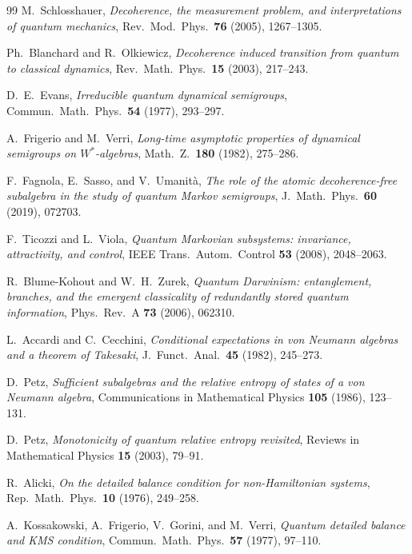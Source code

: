 \documentclass[11pt]{article}
\theoremstyle{definition}
\theoremstyle{remark}
\begin{document}
\begin{thebibliography}{99}
M.~Schlosshauer,
\emph{Decoherence, the measurement problem, and interpretations of quantum
mechanics},
Rev.\ Mod.\ Phys.\ \textbf{76} (2005), 1267--1305.

Ph.~Blanchard and R.~Olkiewicz,
\emph{Decoherence induced transition from quantum to classical dynamics},
Rev.\ Math.\ Phys.\ \textbf{15} (2003), 217--243.

D.~E.~Evans,
\emph{Irreducible quantum dynamical semigroups},
Commun.\ Math.\ Phys.\ \textbf{54} (1977), 293--297.

A.~Frigerio and M.~Verri,
\emph{Long-time asymptotic properties of dynamical semigroups on
$W^*$-algebras},
Math.\ Z.\ \textbf{180} (1982), 275--286.

F.~Fagnola, E.~Sasso, and V.~Umanit\`a,
\emph{The role of the atomic decoherence-free subalgebra in the study of
quantum Markov semigroups},
J.~Math.\ Phys.\ \textbf{60} (2019), 072703.

F.~Ticozzi and L.~Viola,
\emph{Quantum Markovian subsystems: invariance, attractivity, and control},
IEEE Trans.\ Autom.\ Control \textbf{53} (2008), 2048--2063.

R.~Blume-Kohout and W.~H.~Zurek,
\emph{Quantum Darwinism: entanglement, branches, and the emergent
classicality of redundantly stored quantum information},
Phys.\ Rev.\ A \textbf{73} (2006), 062310.


L.~Accardi and C.~Cecchini,
\emph{Conditional expectations in von Neumann algebras and a theorem of
Takesaki},
J.~Funct.\ Anal.\ \textbf{45} (1982), 245--273.

D.~Petz,
\emph{Sufficient subalgebras and the relative entropy of states of a von
Neumann algebra},
Communications in Mathematical Physics \textbf{105} (1986), 123--131.

D.~Petz,
\emph{Monotonicity of quantum relative entropy revisited},
Reviews in Mathematical Physics \textbf{15} (2003), 79--91.

R.~Alicki,
\emph{On the detailed balance condition for non-Hamiltonian systems},
Rep.\ Math.\ Phys.\ \textbf{10} (1976), 249--258.

A.~Kossakowski, A.~Frigerio, V.~Gorini, and M.~Verri,
\emph{Quantum detailed balance and KMS condition},
Commun.\ Math.\ Phys.\ \textbf{57} (1977), 97--110.


\end{thebibliography}
\end{document}
